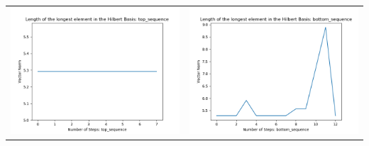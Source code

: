 \documentclass[10pt]{article}
\begin{document}
\begin{tabular}{c|c}
\begin{minipage}{.4\textwidth}
\includegraphics[width=\textwidth]{"DATA/5d/6 generators 2 bound J/top_sequence LENGTH"}
\end{minipage} &
\begin{minipage}{.4\textwidth}
\includegraphics[width=\textwidth]{"DATA/5d/6 generators 2 bound J bottomup/bottom_sequence LENGTH"}
\end{minipage}
\end{tabular}
\end{document}
